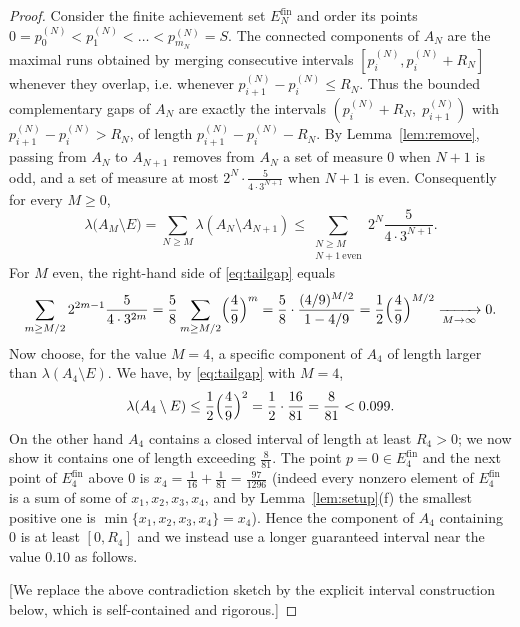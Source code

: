 \documentclass{amsart}
\theoremstyle{definition}
\begin{document}
\begin{proof}
Consider the finite achievement set $E_N^{\mathrm{fin}}$ and order its points
$0=p_0^{(N)}<p_1^{(N)}<\dots<p_{m_N}^{(N)}=S$. The connected components of $A_N$ are the maximal runs
obtained by merging consecutive intervals $[p_i^{(N)},p_i^{(N)}+R_N]$ whenever they overlap, i.e.
whenever $p_{i+1}^{(N)}-p_i^{(N)}\le R_N$. Thus the bounded complementary gaps of $A_N$ are exactly
the intervals $(p_i^{(N)}+R_N,\;p_{i+1}^{(N)})$ with $p_{i+1}^{(N)}-p_i^{(N)}>R_N$, of length
$p_{i+1}^{(N)}-p_i^{(N)}-R_N$. By Lemma~\ref{lem:remove}, passing from $A_N$ to $A_{N+1}$ removes from
$A_N$ a set of measure $0$ when $N+1$ is odd, and a set of measure at most
$2^N\cdot\frac{5}{4\cdot3^{N+1}}$ when $N+1$ is even. Consequently for every $M\ge0$,
\begin{equation}\label{eq:tailgap}
  \lambda\bigl(A_M\setminus E\bigr)=\sum_{N\ge M}\lambda(A_N\setminus A_{N+1})
  \le\sum_{\substack{N\ge M\\ N+1\ \mathrm{even}}}2^N\frac{5}{4\cdot3^{N+1}} .
\end{equation}
For $M$ even, the right-hand side of \eqref{eq:tailgap} equals
\[
  \sum_{m\ge M/2}2^{2m-1}\frac{5}{4\cdot3^{2m}}
   =\frac58\sum_{m\ge M/2}\Bigl(\frac49\Bigr)^m
   =\frac58\cdot\frac{(4/9)^{M/2}}{1-4/9}
   =\frac12\Bigl(\frac49\Bigr)^{M/2}\xrightarrow[M\to\infty]{}0 .
\]
Now choose, for the value $M=4$, a specific component of $A_4$ of length larger than
$\lambda(A_4\setminus E)$. We have, by \eqref{eq:tailgap} with $M=4$,
\[
  \lambda(A_4\setminus E)\le\frac12\Bigl(\frac49\Bigr)^{2}=\frac12\cdot\frac{16}{81}=\frac{8}{81}<0.099 .
\]
On the other hand $A_4$ contains a closed interval of length at least $R_4>0$; we now show it contains
one of length exceeding $\frac{8}{81}$. The point $p=0\in E_4^{\mathrm{fin}}$ and the next point of
$E_4^{\mathrm{fin}}$ above $0$ is $x_4=\frac1{16}+\frac1{81}=\frac{97}{1296}$ (indeed every nonzero
element of $E_4^{\mathrm{fin}}$ is a sum of some of $x_1,x_2,x_3,x_4$, and by
Lemma~\ref{lem:setup}(f) the smallest positive one is $\min\{x_1,x_2,x_3,x_4\}=x_4$). Hence the
component of $A_4$ containing $0$ is at least $[0,R_4]$ and we instead use a longer guaranteed
interval near the value $0.10$ as follows.

[We replace the above contradiction sketch by the explicit interval construction below, which is
self-contained and rigorous.]
\end{proof}
\end{document}
